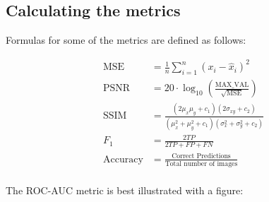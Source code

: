 \subsection{Calculating the metrics}

Formulas for some of the metrics are defined as follows:

\begin{align*}
    \text{MSE} &= \frac{1}{n} \sum_{i=1}^{n} (x_i - \hat{x}_i)^2 \\
    \text{PSNR} &= 20 \cdot \log_{10} \left( \frac{\text{MAX\_VAL}}{\sqrt{\text{MSE}}} \right) \\
    \text{SSIM} &= \frac{(2\mu_x\mu_y + c_1)(2\sigma_{xy} + c_2)}{(\mu_x^2 + \mu_y^2 + c_1)(\sigma_x^2 + \sigma_y^2 + c_2)} \\
    F_1 &= \frac{2TP}{2TP + FP + FN} \\
    \text{Accuracy} &= \frac{\text{Correct Predictions}}{\text{Total number of images}} \\
\end{align*}

The ROC-AUC metric is best illustrated with a figure:
